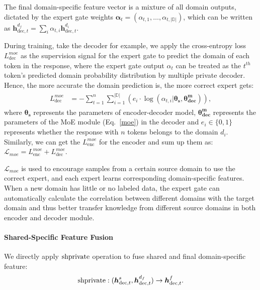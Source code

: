 \documentclass[11pt,a4paper]{article}
\newcommand{\shprivate}{{\rm{shprivate}}}
\begin{document}
The final domain-specific feature vector is a mixture of all domain outputs, dictated by the expert gate weights ${\boldsymbol{\alpha}_t} = (\alpha_{t, 1},\dots,\alpha_{t, \mathbb{|D|}})$, which can be written as $\boldsymbol{h}_{\text{dec}, t}^{{d_{f}}} = \sum_i \alpha_{t, i} \boldsymbol{h}_{\text{dec}, t}^{d_{i}}$.

During training, take the decoder for example, we apply the cross-entropy loss $L_\text{dec}^{moe}$ as the supervision signal for the expert gate to predict the domain of each token in the response, where the expert gate output $\alpha_{t}$ can be treated as the $t^{th}$ token's predicted domain probability distribution by multiple private decoder.
Hence, the more accurate the domain prediction is, the more correct expert gets:
\begin{eqnarray}
\begin{aligned}
L_\text{dec}^{moe} &= -\sum_{t=1}^{n}\sum_{i=1}^{\mathbb{|D|}} (e_{i} \cdot \log (\alpha_{t,i} | \boldsymbol{\theta_{s}},\boldsymbol{\theta_{dec}^m})),
\end{aligned}
\end{eqnarray}
where $\boldsymbol{\theta_{s}}$ represents the parameters of encoder-decoder model, $\boldsymbol{\theta_{dec}^{m}}$ represents the parameters of the MoE module (Eq.~\ref{moe}) in the decoder and $e_i \in \{0,1\}$ represents whether the response with $n$ tokens belongs to the domain $d_i$.
Similarly, we can get the $L_\text{enc}^{moe}$ for the encoder and sum up them as: $\mathcal{L}_{moe} = L_\text{enc}^{moe} + L_\text{dec}^{moe}$.

$\mathcal{L}_{moe}$ is used to encourage samples from a certain source domain to use the correct expert, and each expert learns corresponding domain-specific features. 
When a new domain has little or no labeled data, the expert gate can automatically calculate the correlation between different domains with the target domain and thus better transfer knowledge from different source domains in both encoder and decoder module.

\paragraph{Shared-Specific Feature Fusion}
We directly apply $\shprivate$ operation to fuse shared and final domain-specific feature:
\begin{eqnarray}
\shprivate : (\boldsymbol{h}_{{\text{dec}, t}}^{s}, \boldsymbol{h}_{{\text{dec}, t}}^{d_{f}}) \rightarrow \boldsymbol{h}_{{\text{dec}, t}}^{f}.
\end{eqnarray} 
\end{document}
